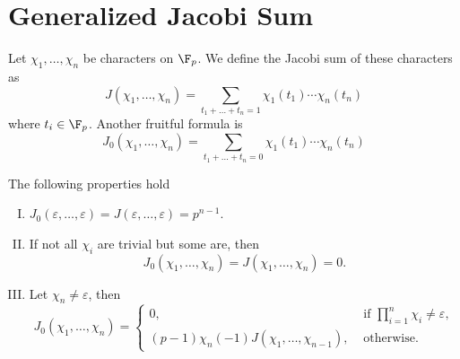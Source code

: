 \section{Generalized Jacobi Sum}

\begin{definition}
    Let \(\chi_1, \dots, \chi_n\) be characters on \(\F_p\). We define the Jacobi
    sum of these characters as
    \[
        J(\chi_1, \dots, \chi_n) = \sum_{t_1+ \dots+t_n = 1}\chi_1(t_1) \cdots
        \chi_n(t_n)
    \]
    where \(t_i \in \F_p\). Another fruitful formula is
    \[
        J_0(\chi_1,\dots,\chi_n) = \sum_{t_1+\dots+t_n = 0}
        \chi_1(t_1)\cdots\chi_n(t_n)
    \]
\end{definition}

\begin{proposition}
    The following properties hold
    \begin{enumerate}[I.]
        \item \(J_0(\varepsilon, \dots, \varepsilon) = J(\varepsilon, \dots,
              \varepsilon) = p^{n-1}\).
        \item If not all \(\chi_i\) are trivial but some are, then
              \[
                  J_0(\chi_1,\dots,\chi_n) = J(\chi_1,\dots,\chi_n) = 0.
              \]
        \item Let \(\chi_n \neq  \varepsilon\), then
              \[
                  J_0(\chi_1,\dots,\chi_n) =
                  \begin{cases}
                      0,                                         & \text{ if } \prod_{i=1}^n \chi_i \neq  \varepsilon, \\
                      (p-1)\chi_n(-1)J(\chi_1,\dots,\chi_{n-1}), & \text{ otherwise. }
                  \end{cases}
              \]
    \end{enumerate}
\end{proposition}

